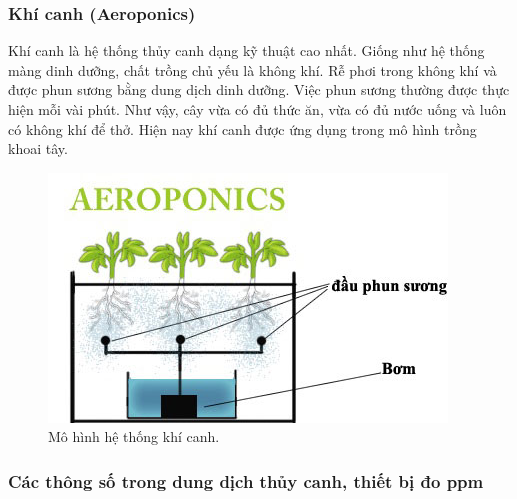 \documentclass[a4paper,12pt,oneside]{article}
\begin{document}
\subsubsection{Khí canh (Aeroponics)}

\noindent Khí canh là hệ thống thủy canh dạng kỹ thuật cao nhất. Giống như hệ thống màng dinh dưỡng, chất trồng chủ yếu là không khí. Rễ phơi trong không khí và được phun sương bằng dung dịch dinh dưỡng. Việc phun sương thường được thực hiện mỗi vài phút. Như vậy, cây vừa có đủ thức ăn, vừa có đủ nước uống và luôn có không khí để thở. Hiện nay khí canh được ứng dụng trong mô hình trồng khoai tây.\\

\begin{center}
\begin{figure}[htp]
\begin{center}
\includegraphics[scale=.9]{hinh/aeroponics.jpg}
\end{center}
\caption{Mô hình hệ thống khí canh.}
\end{figure}
\end{center}

\subsubsection{Các thông số trong dung dịch thủy canh, thiết bị đo ppm}
\end{document}
